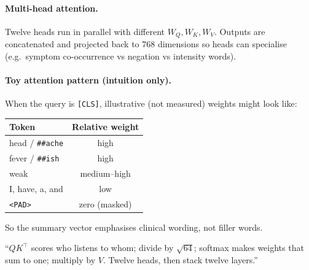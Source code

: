 \paragraph{Multi-head attention.}
Twelve heads run in parallel with different \(W_Q,W_K,W_V\).
Outputs are concatenated and projected back to \(768\) dimensions so heads can specialise
(e.g.\ symptom co-occurrence vs negation vs intensity words).

\paragraph{Toy attention pattern (intuition only).}
When the query is \texttt{[CLS]}, illustrative (not measured) weights might look like:
\begin{center}
\small
\begin{tabular}{@{}lc@{}}
\toprule
Token & Relative weight \\
\midrule
head / \texttt{\#\#ache} & high \\
fever / \texttt{\#\#ish} & high \\
weak & medium--high \\
I, have, a, and & low \\
\texttt{<PAD>} & zero (masked) \\
\bottomrule
\end{tabular}
\end{center}
So the summary vector emphasises clinical wording, not filler words.

\begin{saybox}
``\(QK^\top\) scores who listens to whom; divide by \(\sqrt{64}\); softmax makes weights that sum to one; multiply by \(V\). Twelve heads, then stack twelve layers.''
\end{saybox}
